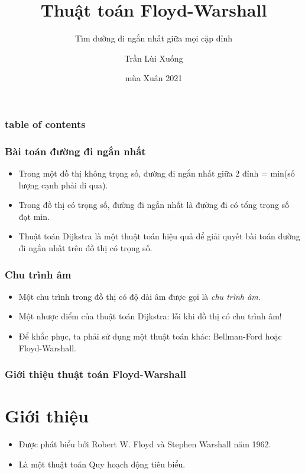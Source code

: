 \documentclass[12pt]{beamer}
\begin{document}
    \author{Trần Lùi Xuống}
    \title{Thuật toán Floyd-Warshall}
    \subtitle{Tìm đường đi ngắn nhất giữa mọi cặp đỉnh}
    \date{mùa Xuân 2021}
    \begin{frame}[plain]
        \maketitle
    \end{frame}

    \begin{frame}
    \frametitle{table of contents}
    \tableofcontents
    \end{frame}

    \begin{frame}[t]
        \frametitle{Bài toán đường đi ngắn nhất}
        \begin{itemize}
            \item Trong một đồ thị không trọng số, đường đi ngắn nhất giữa 2 đỉnh = min(số lượng cạnh phải đi qua).
            \item Trong đồ thị có trọng số, đường đi ngắn nhất là đường đi có tổng trọng số đạt min.
            \item Thuật toán Dijkstra là một thuật toán hiệu quả để giải quyết bài toán đường đi ngắn nhất trên đồ thị có trọng số.
        \end{itemize}
    \end{frame}

    \begin{frame}[t]
        \frametitle{Chu trình âm}
        \begin{itemize}
            \item Một chu trình trong đồ thị có độ dài âm được gọi là \textit{chu trình âm}.
            \item Một nhược điểm của thuật toán Dijkstra: lỗi khi đồ thị có chu trình âm!
            \item Để khắc phục, ta phải sử dụng một thuật toán khác: Bellman-Ford hoặc Floyd-Warshall.
        \end{itemize}
    \end{frame}

    \begin{frame}[t]
        \frametitle{Giới thiệu thuật toán Floyd-Warshall}
        \section{Giới thiệu}

        \begin{itemize}
            \item Được phát biểu bởi Robert W. Floyd và Stephen Warshall năm 1962.
            \item Là một thuật toán Quy hoạch động tiêu biểu.
        \end{itemize}
    \end{frame}
\end{document}
